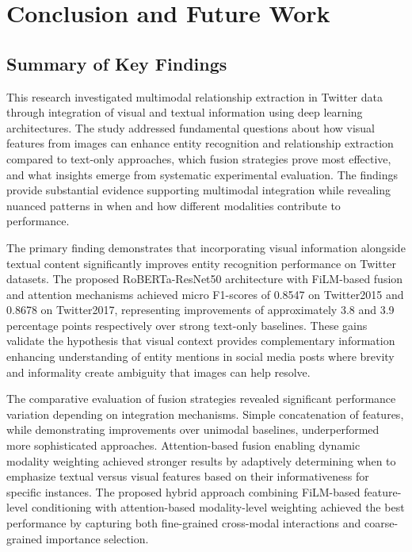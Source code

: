 \documentclass[12pt,a4paper]{report}
\begin{document}
\chapter{Conclusion and Future Work}

\section{Summary of Key Findings}

This research investigated multimodal relationship extraction in Twitter data through integration of visual and textual information using deep learning architectures. The study addressed fundamental questions about how visual features from images can enhance entity recognition and relationship extraction compared to text-only approaches, which fusion strategies prove most effective, and what insights emerge from systematic experimental evaluation. The findings provide substantial evidence supporting multimodal integration while revealing nuanced patterns in when and how different modalities contribute to performance.

The primary finding demonstrates that incorporating visual information alongside textual content significantly improves entity recognition performance on Twitter datasets. The proposed RoBERTa-ResNet50 architecture with FiLM-based fusion and attention mechanisms achieved micro F1-scores of 0.8547 on Twitter2015 and 0.8678 on Twitter2017, representing improvements of approximately 3.8 and 3.9 percentage points respectively over strong text-only baselines. These gains validate the hypothesis that visual context provides complementary information enhancing understanding of entity mentions in social media posts where brevity and informality create ambiguity that images can help resolve.

The comparative evaluation of fusion strategies revealed significant performance variation depending on integration mechanisms. Simple concatenation of features, while demonstrating improvements over unimodal baselines, underperformed more sophisticated approaches. Attention-based fusion enabling dynamic modality weighting achieved stronger results by adaptively determining when to emphasize textual versus visual features based on their informativeness for specific instances. The proposed hybrid approach combining FiLM-based feature-level conditioning with attention-based modality-level weighting achieved the best performance by capturing both fine-grained cross-modal interactions and coarse-grained importance selection.
\end{document}
